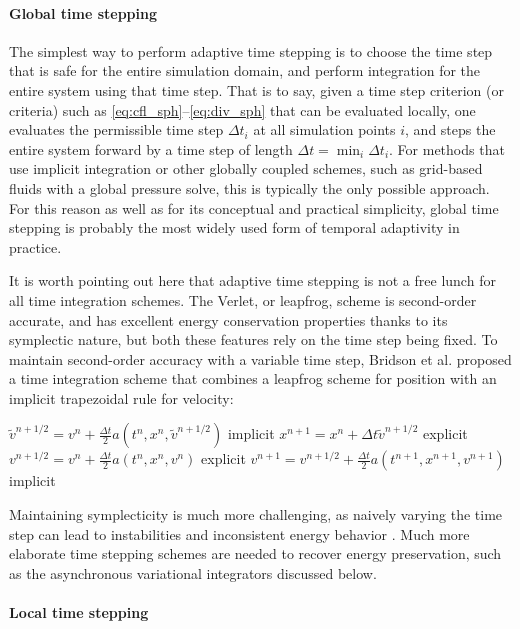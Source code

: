 \paragraph*{Global time stepping}

The simplest way to perform adaptive time stepping is to choose the time step that is safe for the entire simulation domain, and perform integration for the entire system using that time step.
That is to say, given a time step criterion (or criteria) such as \eqref{eq:cfl_sph}--\eqref{eq:div_sph} that can be evaluated locally, one evaluates the permissible time step $\Delta t_i$ at all simulation points $i$, and steps the entire system forward by a time step of length $\Delta t = \min_i \Delta t_i$.
For methods that use implicit integration or other globally coupled schemes, such as grid-based fluids with a global pressure solve, this is typically the only possible approach.
For this reason as well as for its conceptual and practical simplicity, global time stepping is probably the most widely used form of temporal adaptivity in practice.

It is worth pointing out here that adaptive time stepping is not a free lunch for all time integration schemes.
The Verlet, or leapfrog, scheme is second-order accurate, and has excellent energy conservation properties thanks to its symplectic nature, but both these features rely on the time step being fixed.
To maintain second-order accuracy with a variable time step, Bridson et al. \cite{Bridson2003} proposed a time integration scheme that combines a leapfrog scheme for position with an implicit trapezoidal rule for velocity:
\smallskip
\begin{algorithmic}[1]
\State $\tilde v^{n+1/2} = v^n + \frac{\Delta t}2 a(t^n, x^n, \tilde v^{n+1/2})$ \Comment implicit
\State $x^{n+1} = x^n + \Delta t\tilde v^{n+1/2}$ \Comment explicit
\State $v^{n+1/2} = v^n + \frac{\Delta t}2 a(t^n, x^n, v^n)$ \Comment explicit
\State $v^{n+1} = v^{n+1/2} + \frac{\Delta t}2 a(t^{n+1}, x^{n+1}, v^{n+1})$ \Comment implicit
\end{algorithmic}
Maintaining symplecticity is much more challenging, as naively varying the time step can lead to instabilities and inconsistent energy behavior \cite[Sec.\ 3]{Harmon2009}.
Much more elaborate time stepping schemes are needed to recover energy preservation, such as the asynchronous variational integrators discussed below.


\paragraph*{Local time stepping}

